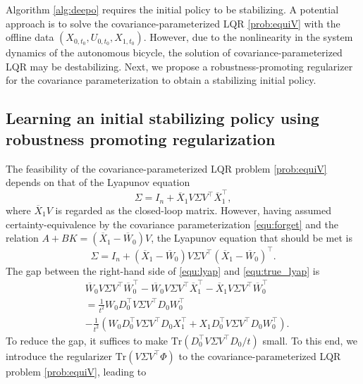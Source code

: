 Algorithm \ref{alg:deepo} requires the initial policy to be stabilizing. A potential approach is to solve the  covariance-parameterized LQR \eqref{prob:equiV} with the offline data $(X_{0,t_0}, U_{0,t_0}, X_{1,t_0})$. However, due to the nonlinearity in the system dynamics of the autonomous bicycle, the solution of covariance-parameterized LQR may be destabilizing. Next, we propose a robustness-promoting regularizer for the covariance parameterization to obtain a stabilizing initial policy.
 
\subsection{Learning an initial stabilizing policy using robustness promoting regularization}


	The feasibility of the covariance-parameterized LQR problem \eqref{prob:equiV} depends on that of the Lyapunov equation
	\begin{equation}\label{equ:lyap}
		\Sigma = I_n + \overline{X}_1V\Sigma V^{\top}\overline{X}_1^{\top},
	\end{equation}
	where $\overline{X}_1V$ is regarded as the closed-loop matrix. However, having assumed certainty-equivalence by the covariance parameterization \eqref{equ:forget} and the relation $A+BK = (\overline{X}_1 - \overline{W}_0)V$, the Lyapunov equation that should be met is
	\begin{equation}\label{equ:true_lyap}
		\Sigma = I_n + (\overline{X}_1 - \overline{W}_0)V\Sigma V^{\top}(\overline{X}_1 - \overline{W}_0)^{\top}.
	\end{equation}
	The gap between the right-hand side of \eqref{equ:lyap} and \eqref{equ:true_lyap} is
	\begin{equation}\label{equ:diff}
		\begin{aligned}
		&\overline{W}_0 V\Sigma V^{\top}  \overline{W}_0^{\top} - \overline{W}_0 V\Sigma V^{\top} \overline{X}_1^{\top} -   \overline{X}_1V\Sigma V^{\top} \overline{W}_0^{\top} \\
		&= \frac{1}{t^2}  W_0D_0^{\top}V\Sigma V^{\top}D_0W_0^{\top} \\
		&-\frac{1}{t^2}(  W_0D_0^{\top}V\Sigma V^{\top}D_0X_1^{\top} +   X_1D_0^{\top}V\Sigma V^{\top}D_0W_0^{\top}).
		\end{aligned}
	\end{equation}
	To reduce the gap, it suffices to make $\text{Tr}(D_0^{\top}V\Sigma V^{\top}D_0/t)$ small. To this end, we introduce the regularizer $\text{Tr}(V\Sigma V^{\top}\Phi)$ to the covariance-parameterized LQR problem \eqref{prob:equiV}, leading to
